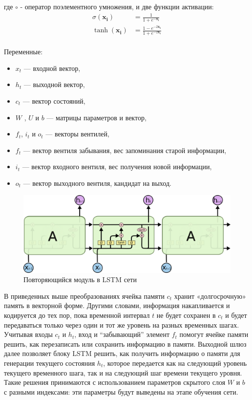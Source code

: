 где $ \circ $ - оператор поэлементного умножения, и две функции активации:
\[\begin{aligned}
 \sigma(\mathbf{x_i}) & =\frac{1}{1+e^{-\mathbf{x_i}}} \, \\
 \tanh(\mathbf{x_i}) & =\frac{1-e^{-2\mathbf{x_i}}}{1+e^{-2\mathbf{x_i}}} \\
 \end{aligned}
\]

Переменные:
\begin{itemize}
\item $ {\displaystyle x_{t}} $ — входной вектор,
\item $ {\displaystyle h_{t}}  $ — выходной вектор,
\item $ {\displaystyle c_{t}}  $ — вектор состояний,
\item $ {\displaystyle W } $ , $ {\displaystyle U }$ и $ {\displaystyle b} $ — матрицы параметров и вектор,
\item $ {\displaystyle f_{t}}  $, $ {\displaystyle i_{t}} $ и $ {\displaystyle o_{t}} $ — векторы вентилей,
\item $ {\displaystyle f_{t}}  $ — вектор вентиля забывания, вес запоминания старой информации,
\item $ {\displaystyle i_{t}}  $ — вектор входного вентиля, вес получения новой информации,
\item $ {\displaystyle o_{t}} $ — вектор выходного вентиля, кандидат на выход.
\end{itemize}
\begin{figure}[h]
	\centering
	\includegraphics[width=0.7\linewidth]{lstm}
	\caption{Повторяющийся модуль в LSTM сети}
	\label{fig:lstm}
\end{figure}

В приведенных выше преобразованиях ячейка памяти $ c_t $ хранит «долгосрочную» память в векторной форме. Другими словами, информация накапливается и кодируется до тех пор, пока временной интервал $ t $ не будет сохранен в $ c_t $ и будет передаваться только через один и тот же уровень на разных временных шагах.
Учитывая входы $ c_t $ и $ h_t $, вход и “забывающий” элемент $ f_t $ помогут ячейке памяти решить, как перезаписать или сохранить информацию в памяти. Выходной шлюз далее позволяет блоку LSTM решить, как получить информацию о памяти для генерации текущего состояния $ h_t $, которое передается как на следующий уровень текущего временного шага, так и на следующий шаг времени текущего уровня. Такие решения принимаются с использованием параметров скрытого слоя $ W $ и $ b $ с разными индексами: эти параметры будут выведены на этапе обучения сети.

